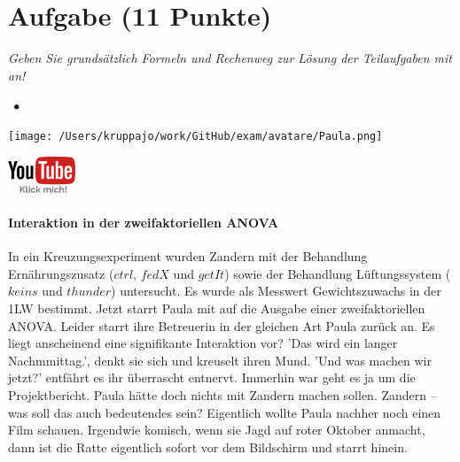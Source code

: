 \documentclass[a4paper, 9pt]{scrartcl}\usepackage[]{graphicx}\usepackage[]{xcolor}
\begin{document}
\clearpage

\section{Aufgabe \hfill (11 Punkte)}

\textit{Geben Sie grundsätzlich Formeln und Rechenweg zur Lösung der Teilaufgaben mit an!} \\[1Ex]
 

 
\ifcollection
\begin{flushright}
\tiny\vspace{-3Ex}
\textbf{\examinhaltstart}
\exammodulestatversuch $\;\bullet$
\exammodulebiostat
\vspace{-4Ex}
\end{flushright}
\begin{minipage}[t]{0.5\textwidth}
\texttt{[image: /Users/kruppajo/work/GitHub/exam/avatare/Paula.png]}
\end{minipage}
\begin{minipage}[t]{0.5\textwidth}
\hfill
\href{https://youtu.be/2qG1Dws0MJo}{\includegraphics[width = 2cm]{img/youtube}}
\end{minipage}
\vspace{-3Ex}
\fi



\ifcollection
\paragraph{Interaktion in der zweifaktoriellen ANOVA}
\fi

In ein Kreuzungsexperiment wurden Zandern mit der Behandlung Ernährungszusatz ($ctrl$, $fedX$ und $getIt$) sowie der Behandlung Lüftungssystem ($keins$ und $thunder$) untersucht. Es wurde als Messwert Gewichtszuwachs in der 1LW bestimmt. Jetzt starrt Paula mit auf die \Rlogo Ausgabe einer zweifaktoriellen ANOVA. Leider starrt ihre Betreuerin in der gleichen Art Paula zurück an. Es liegt anscheinend eine signifikante Interaktion vor? 'Das wird ein langer Nachmmittag.', denkt sie sich und kreuselt ihren Mund. 'Und was machen wir jetzt?' entfährt es ihr überrascht entnervt. Immerhin war geht es ja um die Projektbericht. Paula hätte doch nichts mit Zandern machen sollen. Zandern -- was soll das auch bedeutendes sein? Eigentlich wollte Paula nachher noch einen Film schauen. Irgendwie komisch, wenn sie Jagd auf roter Oktober anmacht, dann ist die Ratte eigentlich sofort vor dem Bildschirm und starrt hinein.
\end{document}
